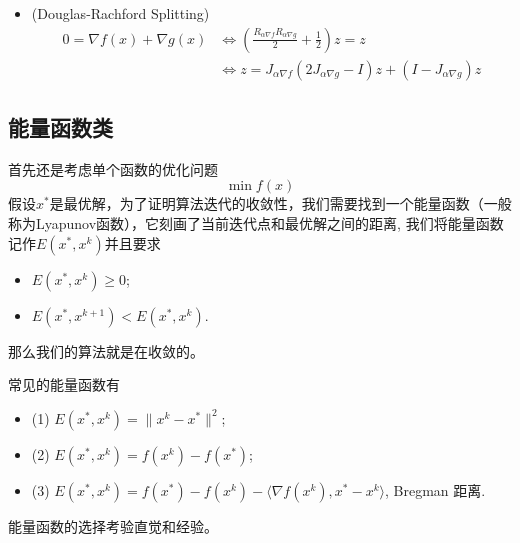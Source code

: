 \begin{itemize}
\begin{equation}
\begin{aligned}
            \Longleftrightarrow& 2J_{\alpha\nabla f}R_{\alpha \nabla g}z-R_{\alpha \nabla g}z= z\\
            \Longleftrightarrow& R_{\alpha\nabla f}R_{\alpha \nabla g}z= z
        \end{aligned}
    \end{equation}
    \item (Douglas-Rachford Splitting) 
    \begin{equation}
        \begin{aligned}
            0=\nabla f(x) + \nabla g(x)&\Longleftrightarrow(\frac{R_{\alpha\nabla f}R_{\alpha \nabla g}}{2}+\frac{1}{2})z= z\\
           &  \Longleftrightarrow z = J_{\alpha \nabla f}(2J_{\alpha\nabla g}-I)z +(I-J_{\alpha\nabla g})z
        \end{aligned}
    \end{equation}
\end{itemize}
\subsection{能量函数类}
首先还是考虑单个函数的优化问题
\begin{equation}\label{eq:opt_problem}
\min f(x)
\end{equation}
假设\(x^*\)是最优解，为了证明算法迭代的收敛性，我们需要找到一个能量函数（一般称为Lyapunov函数），它刻画了当前迭代点和最优解之间的距离, 我们将能量函数记作$E(x^*,x^k)$并且要求
\begin{itemize}
    \item $E(x^*,x^k) \geq 0$;
    \item $E(x^*,x^{k+1}) < E(x^*,x^k)$.
\end{itemize}
那么我们的算法就是在收敛的。

常见的能量函数有
\begin{itemize}
    \item (1) $E(x^*,x^k) = \|x^k - x^*\|^2$;
    \item (2) $E(x^*,x^k) = f(x^k) - f(x^*)$;
    \item (3) $E(x^*,x^k) = f(x^*) - f(x^k) -\langle\nabla f(x^k),x^*-x^k \rangle $, Bregman 距离.
\end{itemize}
\begin{remark}
    能量函数的选择考验直觉和经验。
\end{remark}

\newpage
